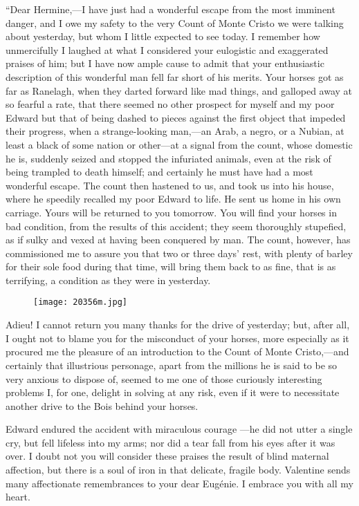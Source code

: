 “Dear Hermine,—I have just had a wonderful escape from the most
imminent danger, and I owe my safety to the very Count of Monte Cristo
we were talking about yesterday, but whom I little expected to see
today. I remember how unmercifully I laughed at what I considered your
eulogistic and exaggerated praises of him; but I have now ample cause
to admit that your enthusiastic description of this wonderful man fell
far short of his merits. Your horses got as far as Ranelagh, when they
darted forward like mad things, and galloped away at so fearful a rate,
that there seemed no other prospect for myself and my poor Edward but
that of being dashed to pieces against the first object that impeded
their progress, when a strange-looking man,—an Arab, a negro, or a
Nubian, at least a black of some nation or other—at a signal from the
count, whose domestic he is, suddenly seized and stopped the infuriated
animals, even at the risk of being trampled to death himself; and
certainly he must have had a most wonderful escape. The count then
hastened to us, and took us into his house, where he speedily recalled
my poor Edward to life. He sent us home in his own carriage. Yours will
be returned to you tomorrow. You will find your horses in bad
condition, from the results of this accident; they seem thoroughly
stupefied, as if sulky and vexed at having been conquered by man. The
count, however, has commissioned me to assure you that two or three
days’ rest, with plenty of barley for their sole food during that time,
will bring them back to as fine, that is as terrifying, a condition as
they were in yesterday.

\begin{figure}[ht]
\texttt{[image: 20356m.jpg]}
\end{figure}

Adieu! I cannot return you many thanks for the drive of yesterday; but,
after all, I ought not to blame you for the misconduct of your horses,
more especially as it procured me the pleasure of an introduction to
the Count of Monte Cristo,—and certainly that illustrious personage,
apart from the millions he is said to be so very anxious to dispose of,
seemed to me one of those curiously interesting problems I, for one,
delight in solving at any risk, even if it were to necessitate another
drive to the Bois behind your horses.

Edward endured the accident with miraculous courage —he did not utter a
single cry, but fell lifeless into my arms; nor did a tear fall from
his eyes after it was over. I doubt not you will consider these praises
the result of blind maternal affection, but there is a soul of iron in
that delicate, fragile body. Valentine sends many affectionate
remembrances to your dear Eugénie. I embrace you with all my heart.

